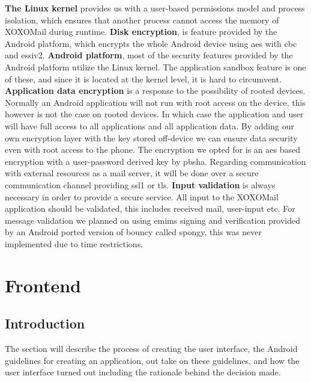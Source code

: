 \textbf{The Linux kernel} provides us with a user-based permissions model and process isolation, which ensures that another process cannot access the memory of XOXOMail during runtime.
\newline
\newline
\textbf{Disk encryption}, is feature provided by the Android platform, which encrypts the whole Android device using \gls{aes} with \gls{cbc} and \gls{essiv2}.\cite{bib:crypto}
\newline
\newline
\textbf{Android platform}, most of the security features provided by the Android platform utilize the Linux kernel. The application sandbox feature is one of these, and since it is located at the kernel level, it is hard to circumvent.
\newline
\newline
\textbf{Application data encryption} is a response to the possibility of rooted devices. Normally an Android application will not run with root access on the device, this however is not the case on rooted devices. In which case the application and user will have full access to all applications and all application data. By adding our own encryption layer with the key stored off-device we can ensure data security even with root access to the phone\cite{bib:tech}. The encryption we opted for is an \gls{aes} based encryption with a user-password derived key by \gls{pbsha}.
Regarding communication with external resources as a mail server, it will be done over a secure communication channel providing \gls{ssl1} or \gls{tls}. 
\newline
\newline
\textbf{Input validation} is always necessary in order to provide a secure service. All input to the XOXOMail application should be validated, this includes received mail, user-input etc. For message validation we planned on using \gls{emims} signing and verification provided by an Android ported version of \gls{bouncy} called \gls{spongy}, this was never implemented due to time restrictions. 

\section{Frontend}

\subsection{Introduction}
The section will describe the process of creating the user interface, the Android guidelines for creating an application, out take on these guidelines, and how the user interface turned out including the rationale behind the decision made.

